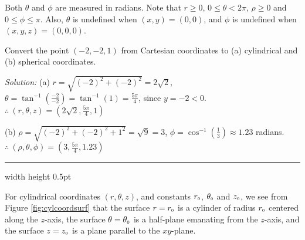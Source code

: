\vspace{6mm}
\vspace{2mm}

\par Both $\theta$ and $\phi$ are measured in radians.
Note that $r \ge 0$, $0 \le \theta < 2\pi$, $\rho \ge 0$ and $0 \le \phi \le \pi$.
Also, $\theta$ is undefined when $(x,y) = (0,0)$, and $\phi$ is undefined when $(x,y,z) = (0,0,0)$.
\newpage
\begin{exmp}
 Convert the point $(-2,-2,1)$ from Cartesian coordinates to (a) cylindrical and (b) spherical
 coordinates.\vspace{1.5mm}
 \par\noindent\emph{Solution:} (a) $r = \sqrt{(-2)^2 + (-2)^2} = 2\sqrt{2}$, $\theta =
 \tan^{-1} \left( \frac{-2}{-2} \right) = \tan^{-1}(1) = \frac{5 \pi}{4}$, since $y = -2 < 0$.\\
 $\therefore ~ (r,\theta,z) = \left( 2\sqrt{2},\frac{5 \pi}{4},1 \right)$\vspace{2mm}
 \par\noindent (b) $\rho = \sqrt{(-2)^2 + (-2)^2 + 1^2} = \sqrt{9} = 3$, $\phi = \cos^{-1} \left( \frac{1}{3} \right)
 \approx 1.23$ radians.\\
 $\therefore ~ (\rho,\theta,\phi) = \left( 3,\frac{5 \pi}{4}, 1.23 \right)$
 \end{exmp}
\hrule width \textwidth height 0.5pt
\vspace{2mm}

For cylindrical coordinates $(r,\theta,z)$, and constants $r_{\scriptscriptstyle 0}$, $\theta_{\scriptscriptstyle 0}$ and $z_{\scriptscriptstyle 0}$, we see
from Figure \ref{fig:cylcoordsurf}
that the surface $r = r_{\scriptscriptstyle 0}$ is a cylinder of radius $r_{\scriptscriptstyle 0}$ centered along the $z$-axis, the surface
$\theta = \theta_{\scriptscriptstyle 0}$ is a half-plane emanating from the $z$-axis, and the surface $z = z_{\scriptscriptstyle 0}$ is a plane
parallel to the $xy$-plane.

